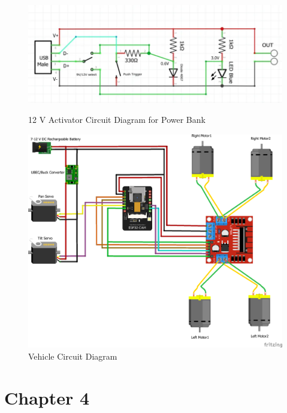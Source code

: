 \documentclass[12pt,a4paper]{report}
\begin{document}
\begin{enumerate}
\begin{figure}[H]
    \centering
    \begin{minipage}{0.45\textwidth}
        \centering
        \includegraphics[width=\textwidth]{usbPowerbank}  %
        \caption{12 V Activator Circuit Diagram for Power Bank}
        \label{fig:base}
    \end{minipage} \hfill
    \begin{minipage}{0.45\textwidth}
        \centering
        \includegraphics[width=\textwidth]{circuitDiagram}  %
        \caption{Vehicle Circuit Diagram}
        \label{fig:circuitDiagram}
    \end{minipage}
\end{figure}    
    
\end{enumerate}





	{\vfill \chapter*{\centering \vfill Chapter 4 \vfill}\vfill}
	\thispagestyle{empty}
	\newpage
	\label{Implementation}
\end{document}
